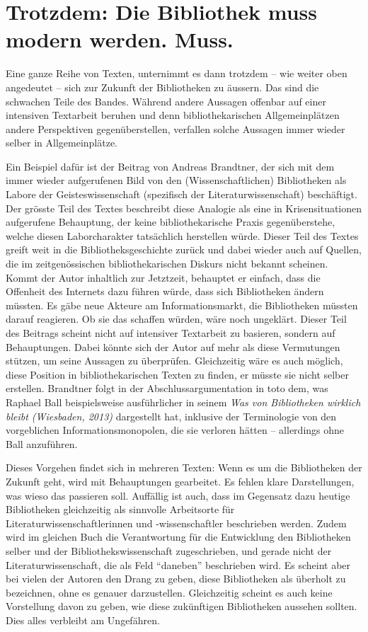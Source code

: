 \documentclass[a4paper,
fontsize=11pt,
oneside,
numbers=noperiodatend,
parskip=half-,
bibliography=totoc,
final
]{scrartcl}
\begin{document}
\section*{Trotzdem: Die Bibliothek muss modern werden.
Muss.}\label{trotzdem-die-bibliothek-muss-modern-werden.-muss.}

Eine ganze Reihe von Texten, unternimmt es dann trotzdem -- wie weiter
oben angedeutet -- sich zur Zukunft der Bibliotheken zu äussern. Das
sind die schwachen Teile des Bandes. Während andere Aussagen offenbar
auf einer intensiven Textarbeit beruhen und denn bibliothekarischen
Allgemeinplätzen andere Perspektiven gegenüberstellen, verfallen solche
Aussagen immer wieder selber in Allgemeinplätze.

Ein Beispiel dafür ist der Beitrag von Andreas Brandtner, der sich mit
dem immer wieder aufgerufenen Bild von den (Wissenschaftlichen)
Bibliotheken als Labore der Geisteswissenschaft (spezifisch der
Literaturwissenschaft) beschäftigt. Der grösste Teil des Textes
beschreibt diese Analogie als eine in Krisensituationen aufgerufene
Behauptung, der keine bibliothekarische Praxis gegenüberstehe, welche
diesen Laborcharakter tatsächlich herstellen würde. Dieser Teil des
Textes greift weit in die Bibliotheksgeschichte zurück und dabei wieder
auch auf Quellen, die im zeitgenössischen bibliothekarischen Diskurs
nicht bekannt scheinen. Kommt der Autor inhaltlich zur Jetztzeit,
behauptet er einfach, dass die Offenheit des Internets dazu führen
würde, dass sich Bibliotheken ändern müssten. Es gäbe neue Akteure am
Informationsmarkt, die Bibliotheken müssten darauf reagieren. Ob sie das
schaffen würden, wäre noch ungeklärt. Dieser Teil des Beitrags scheint
nicht auf intensiver Textarbeit zu basieren, sondern auf Behauptungen.
Dabei könnte sich der Autor auf mehr als diese Vermutungen stützen, um
seine Aussagen zu überprüfen. Gleichzeitig wäre es auch möglich, diese
Position in bibliothekarischen Texten zu finden, er müsste sie nicht
selber erstellen. Brandtner folgt in der Abschlussargumentation in toto
dem, was Raphael Ball beispielsweise ausführlicher in seinem \emph{Was
von Bibliotheken wirklich bleibt (Wiesbaden, 2013)} dargestellt hat,
inklusive der Terminologie von den vorgeblichen Informationsmonopolen,
die sie verloren hätten -- allerdings ohne Ball anzuführen.

Dieses Vorgehen findet sich in mehreren Texten: Wenn es um die
Bibliotheken der Zukunft geht, wird mit Behauptungen gearbeitet. Es
fehlen klare Darstellungen, was wieso das passieren soll. Auffällig ist
auch, dass im Gegensatz dazu heutige Bibliotheken gleichzeitig als
sinnvolle Arbeitsorte für Literaturwissenschaftlerinnen und
-wissenschaftler beschrieben werden. Zudem wird im gleichen Buch die
Verantwortung für die Entwicklung den Bibliotheken selber und der
Bibliothekswissenschaft zugeschrieben, und gerade nicht der
Literaturwissenschaft, die als Feld \enquote{daneben} beschrieben wird.
Es scheint aber bei vielen der Autoren den Drang zu geben, diese
Bibliotheken als überholt zu bezeichnen, ohne es genauer darzustellen.
Gleichzeitig scheint es auch keine Vorstellung davon zu geben, wie diese
zukünftigen Bibliotheken aussehen sollten. Dies alles verbleibt am
Ungefähren.
\end{document}
